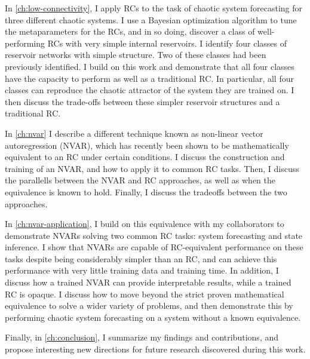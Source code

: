 In \cref{ch:low-connectivity}, I apply RCs to the task of chaotic
system forecasting for three different chaotic systems. I use a
Bayesian optimization algorithm to tune the metaparameters for the
RCs, and in so doing, discover a class of well-performing RCs with very
simple internal reservoirs. I identify four classes of reservoir
networks with simple structure. Two of these classes had been
previously identified. I build on this work and demonstrate that all
four classes have the capacity to perform as well as a traditional
RC. In particular, all four classes can reproduce the chaotic
attractor of the system they are trained on. I then discuss the
trade-offs between these simpler reservoir structures and a
traditional RC.

In \cref{ch:nvar} I describe a different technique known as
non-linear vector autoregression (NVAR), which has recently been shown
to be mathematically equivalent to an RC under certain conditions. I
discuss the construction and training of an NVAR, and how to apply it
to common RC tasks. Then, I discuss the parallells between the NVAR
and RC approaches, as well as when the equivalence is known to
hold. Finally, I discuss the tradeoffs between the two approaches.

In \cref{ch:nvar-application}, I build on this equivalence with my
collaborators to demonstrate NVARs solving two common RC tasks: system
forecasting and state inference. I show that NVARs are capable of
RC-equivalent performance on these tasks despite being considerably
simpler than an RC, and can achieve this performance with very little
training data and training time. In addition, I discuss how a trained
NVAR can provide interpretable results, while a trained RC is
opaque. I discuss how to move beyond the strict proven mathematical
equivalence to solve a wider variety of problems, and then demonstrate
this by performing chaotic system forecasting on a system without a
known equivalence.


Finally, in \cref{ch:conclusion}, I summarize my findings and
contributions, and propose interesting new directions for future
research discovered during this work.
